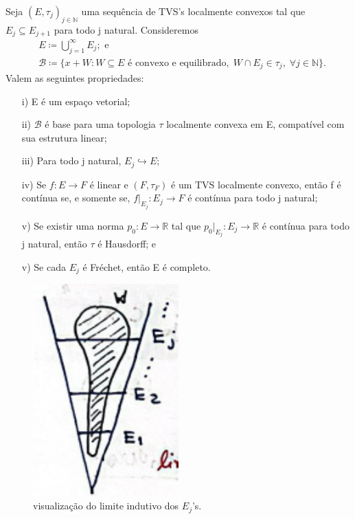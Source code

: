 \documentclass[../distribution_theory_notes.tex]{subfiles}
\begin{document}
\hypertarget{inductive_limit}{\begin{theorem*}
  Seja \((E, \tau_{j})_{j\in \mathbb{N}}\) uma sequência de TVS's localmente convexos tal que \(E_{j}\subseteq E_{j+1}\) para todo j natural. Consideremos 
 \begin{align*}
   & E \coloneqq \bigcup_{j=1}^{\infty}E_{j}; \text{ e}\\
   & \mathcal{B}\coloneqq \{x+W: W\subseteq E \text{ é convexo e equilibrado},\; W\cap E_{j}\in \tau_{j},\; \forall j\in \mathbb{N}\}.
 \end{align*}
 Valem as seguintes propriedades: 
\begin{itemize}
  \item[i)] E é um espaço vetorial; 
    \item[ii)] \(\mathcal{B}\) é base para uma topologia \(\tau \) localmente convexa em E, compatível com sua estrutura linear; 
      \item[iii)] Para todo j natural, \(E_{j}\hookrightarrow E\);
        \item[iv)] Se \(f:E\rightarrow F\) é linear e \((F,  \tau_{F})\) é um TVS localmente convexo, então f é contínua se, e somente se, \(f|_{E_{j}}:E_{j}\rightarrow F\) é contínua para todo j natural;
          \item[v)] Se existir uma norma \(p_{0}:E\rightarrow \mathbb{R}\) tal que \(p_{0}|_{E_{j}}:E_{j}\rightarrow \mathbb{R}\) é contínua para todo j natural, então \(\tau \) é Hausdorff; e
\item[v)] Se cada \(E_{j}\) é Fréchet, então E é completo.
\end{itemize}
\end{theorem*}}
\begin{figure}[H]
\begin{center}
\includegraphics[height=0.5\textheight, width=0.5\textwidth, keepaspectratio]{./Images/inductive_limit_06.png}
\end{center}
\caption{visualização do limite indutivo dos \(E_{j}\)'s.}
\end{figure}
\end{document}
